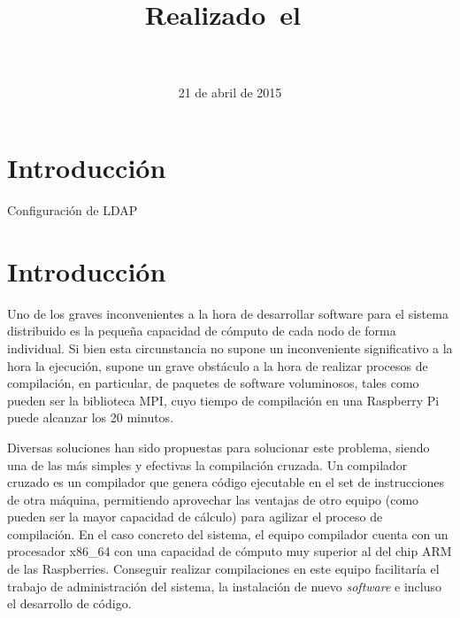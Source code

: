 \documentclass{article}
\title{
\vspace{2in}
\textmd{\textbf{\hmwkTitle}}\\
\normalsize\vspace{0.1in}\small{Realizado\ el\ \hmwkDueDate}\\
\vspace{0.1in}\large{\textit{\hmwkClassInstructor\ }}
\vspace{3in}
}
\title{\hmwkTitle}
\author{\textbf{\hmwkAuthorName}}
\date{21 de abril de 2015}
\begin{document}
\maketitle


\setcounter{tocdepth}{1}

\newpage
\tableofcontents
\newpage

\section{Introducción}

Configuración de LDAP

\section{}


\section{Introducción}

Uno de los graves inconvenientes a la hora de desarrollar software para el sistema distribuido es la pequeña capacidad de cómputo de cada nodo de forma individual. Si bien esta circunstancia no supone un inconveniente significativo a la hora la ejecución, supone un grave obstáculo a la hora de realizar procesos de compilación, en particular, de paquetes de software voluminosos, tales como pueden ser la biblioteca MPI, cuyo tiempo de compilación en una Raspberry Pi puede alcanzar los 20 minutos.

Diversas soluciones han sido propuestas para solucionar este problema, siendo una de las más simples y efectivas la compilación cruzada. Un compilador cruzado es un compilador que genera código ejecutable en el set de instrucciones de otra máquina, permitiendo aprovechar las ventajas de otro equipo (como pueden ser la mayor capacidad de cálculo) para agilizar el proceso de compilación. En el caso concreto del sistema, el equipo compilador cuenta con un procesador x86_64 con una capacidad de cómputo muy superior al del chip ARM de las Raspberries. Conseguir realizar compilaciones en este equipo facilitaría el trabajo de administración del sistema, la instalación de nuevo \textit{software} e incluso el desarrollo de código.
\end{document}
